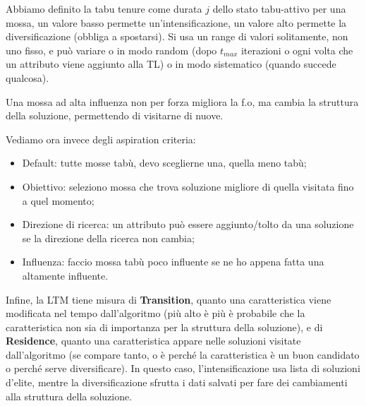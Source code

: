 Abbiamo definito la tabu tenure come durata $j$ dello stato tabu-attivo per una mossa, un valore basso permette un'intensificazione, un valore alto permette la diversificazione (obbliga a spostarsi). Si usa un range di valori solitamente, non uno fisso, e può variare o in modo random (dopo $t_{max}$ iterazioni o ogni volta che un attributo viene aggiunto alla TL) o in modo sistematico (quando succede qualcosa).

Una mossa ad alta influenza non per forza migliora la f.o, ma cambia la struttura della soluzione, permettendo di visitarne di nuove.

Vediamo ora invece degli aspiration criteria:
\begin{itemize}
	\item Default: tutte mosse tabù, devo sceglierne una, quella meno tabù;
	\item Obiettivo: seleziono mossa che trova soluzione migliore di quella visitata fino a quel momento;
	\item Direzione di ricerca: un attributo può essere aggiunto/tolto da una soluzione se la direzione della ricerca non cambia;
	\item Influenza: faccio mossa tabù poco influente se ne ho appena fatta una altamente influente.
\end{itemize}

Infine, la LTM tiene misura di \textbf{Transition}, quanto una caratteristica viene modificata nel tempo dall'algoritmo (più alto è più è probabile che la caratteristica non sia di importanza per la struttura della soluzione), e di \textbf{Residence}, quanto una caratteristica appare nelle soluzioni visitate dall'algoritmo (se compare tanto, o è perché la caratteristica è un buon candidato o perché serve diversificare).
In questo caso, l'intensificazione usa lista di soluzioni d'elite, mentre la diversificazione sfrutta i dati salvati per fare dei cambiamenti alla struttura della soluzione.
